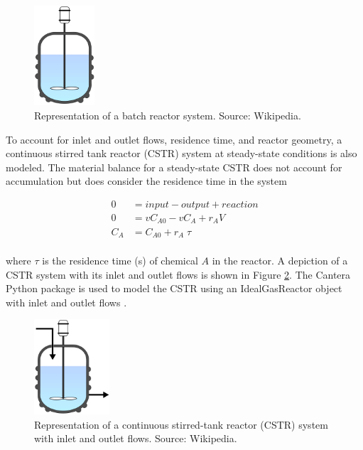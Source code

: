 \begin{figure}[H]
    \centering
    \includegraphics[width=0.2\textwidth]{figures/reactor-batch.png}
    \caption{Representation of a batch reactor system. Source: Wikipedia.}
    \label{fig:reactor-batch}
\end{figure}

To account for inlet and outlet flows, residence time, and reactor geometry, a continuous stirred tank reactor (CSTR) system at steady-state conditions is also modeled. The material balance for a steady-state CSTR does not account for accumulation but does consider the residence time in the system

\begin{equation}
    \begin{aligned}
        0 &= input - output + reaction \\
        0 &= v C_{A0} - v C_A + r_A V \\
        C_A &= C_{A0} + r_A\;\tau \\
    \end{aligned}
\end{equation}

\noindent where $\tau$ is the residence time (s) of chemical $A$ in the reactor. A depiction of a CSTR system with its inlet and outlet flows is shown in Figure \ref{fig:reactor-cstr}. The Cantera Python package is used to model the CSTR using an IdealGasReactor object with inlet and outlet flows \cite{Cantera-2018}.

\begin{figure}[H]
    \centering
    \includegraphics[width=0.25\textwidth]{figures/reactor-cstr.png}
    \caption{Representation of a continuous stirred-tank reactor (CSTR) system with inlet and outlet flows. Source: Wikipedia.}
    \label{fig:reactor-cstr}
\end{figure}

